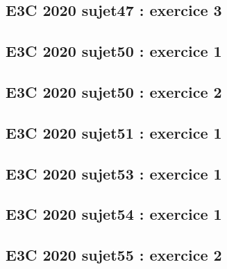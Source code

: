 \documentclass[lang=fr,edition=teacher,layout=sheet]{mxbook}
\begin{document}
\begingroup\endgroup
\par\bigskip
{}\subsection*{E3C 2020 sujet47 : exercice 3}
\begingroup\endgroup
\par\bigskip
{}\subsection*{E3C 2020 sujet50 : exercice 1}
\begingroup\endgroup
\par\bigskip
{}\subsection*{E3C 2020 sujet50 : exercice 2}
\begingroup\endgroup
\par\bigskip
{}\subsection*{E3C 2020 sujet51 : exercice 1}
\begingroup\endgroup
\par\bigskip
{}\subsection*{E3C 2020 sujet53 : exercice 1}
\begingroup\endgroup
\par\bigskip
{}\subsection*{E3C 2020 sujet54 : exercice 1}
\begingroup\endgroup
\par\bigskip
{}\subsection*{E3C 2020 sujet55 : exercice 2}
\begingroup\endgroup
\end{document}
